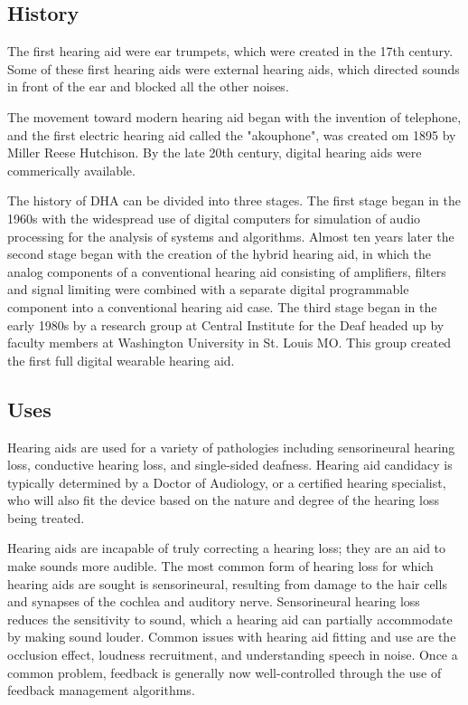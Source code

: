 \documentclass[12pt]{article}
\begin{document}
\subsection{History}

The first hearing aid were ear trumpets, which were created in the 17th century. Some of these first hearing aids were external hearing aids, which directed sounds in front of the ear and blocked all the other noises.


The movement toward modern hearing aid began with the invention of telephone, and the first electric hearing aid called the "akouphone", was created om 1895 by Miller Reese Hutchison. By the late 20th century, digital hearing aids were commerically available.


The history of DHA can be divided into three stages. The first stage began in the 1960s with the widespread use of digital computers for simulation of audio processing for the analysis of systems and algorithms. Almost ten years later the second stage began with the creation of the hybrid hearing aid, in which the analog components of a conventional hearing aid consisting of amplifiers, filters and signal limiting were combined with a separate digital programmable component into a conventional hearing aid case. The third stage began in the early 1980s by a research group at Central Institute for the Deaf headed up by faculty members at Washington University in St. Louis MO. This group created the first full digital wearable hearing aid.


\subsection{Uses}

Hearing aids are used for a variety of pathologies including sensorineural hearing loss, conductive hearing loss, and single-sided deafness. Hearing aid candidacy is typically determined by a Doctor of Audiology, or a certified hearing specialist, who will also fit the device based on the nature and degree of the hearing loss being treated.


Hearing aids are incapable of truly correcting a hearing loss; they are an aid to make sounds more audible. The most common form of hearing loss for which hearing aids are sought is sensorineural, resulting from damage to the hair cells and synapses of the cochlea and auditory nerve. Sensorineural hearing loss reduces the sensitivity to sound, which a hearing aid can partially accommodate by making sound louder. Common issues with hearing aid fitting and use are the occlusion effect, loudness recruitment, and understanding speech in noise. Once a common problem, feedback is generally now well-controlled through the use of feedback management algorithms.
\end{document}
